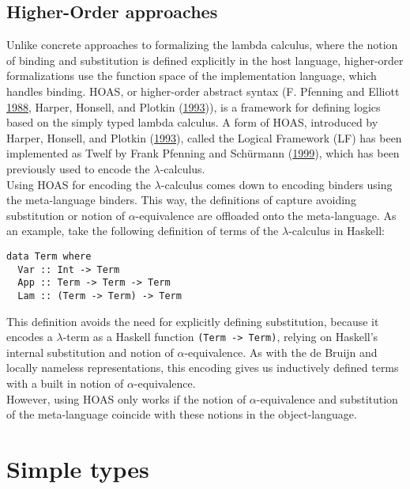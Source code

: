 \documentclass[a4paper, 12pt, twoside]{style/ociamthesis}
\theoremstyle{plain}
\theoremstyle{definition}
\theoremstyle{remark}
\begin{document}
\subsection{Higher-Order approaches}\label{higher-order-approaches}

Unlike concrete approaches to formalizing the lambda calculus, where the
notion of binding and substitution is defined explicitly in the host
language, higher-order formalizations use the function space of the
implementation language, which handles binding. HOAS, or higher-order
abstract syntax (F. Pfenning and Elliott
\protect\hyperlink{ref-pfenning88}{1988}, Harper, Honsell, and Plotkin
(\protect\hyperlink{ref-harper93}{1993})), is a framework for defining
logics based on the simply typed lambda calculus. A form of HOAS,
introduced by Harper, Honsell, and Plotkin
(\protect\hyperlink{ref-harper93}{1993}), called the Logical Framework
(LF) has been implemented as Twelf by Frank Pfenning and Schürmann
(\protect\hyperlink{ref-pfenning99}{1999}), which has been previously
used to encode the \(\lambda\)-calculus.\\
Using HOAS for encoding the \(\lambda\)-calculus comes down to encoding
binders using the meta-language binders. This way, the definitions of
capture avoiding substitution or notion of \(\alpha\)-equivalence are
offloaded onto the meta-language. As an example, take the following
definition of terms of the \(\lambda\)-calculus in Haskell:

\begin{verbatim}
data Term where
  Var :: Int -> Term
  App :: Term -> Term -> Term
  Lam :: (Term -> Term) -> Term
\end{verbatim}

This definition avoids the need for explicitly defining substitution,
because it encodes a \(\lambda\)-term as a Haskell function
\texttt{(Term -> Term)}, relying on Haskell's internal substitution and
notion of \(\alpha\)-equivalence. As with the de Bruijn and locally
nameless representations, this encoding gives us inductively defined
terms with a built in notion of \(\alpha\)-equivalence.\\
However, using HOAS only works if the notion of \(\alpha\)-equivalence
and substitution of the meta-language coincide with these notions in the
object-language.

\newpage

\section{Simple types}\label{simple-types}
\end{document}
